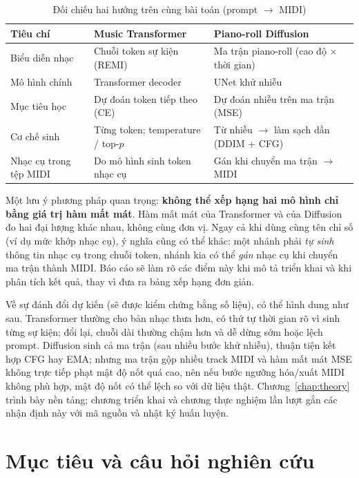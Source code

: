 \begin{table}[htbp]
\centering
\caption{Đối chiếu hai hướng trên cùng bài toán (prompt $\rightarrow$ MIDI)}
\label{tab:ch1-arch-preview}
\begin{tabular}{p{3.2cm}p{5.5cm}p{5.5cm}}
\toprule
\textbf{Tiêu chí} & \textbf{Music Transformer} & \textbf{Piano-roll Diffusion} \\
\midrule
Biểu diễn nhạc &
Chuỗi token sự kiện (REMI) &
Ma trận piano-roll (cao độ $\times$ thời gian) \\
\midrule
Mô hình chính &
Transformer decoder &
UNet khử nhiễu \\
\midrule
Mục tiêu học &
Dự đoán token tiếp theo (CE) &
Dự đoán nhiễu trên ma trận (MSE) \\
\midrule
Cơ chế sinh &
Từng token; temperature / top-$p$ &
Từ nhiễu $\rightarrow$ làm sạch dần (DDIM + CFG) \\
\midrule
Nhạc cụ trong tệp MIDI &
Do mô hình sinh token nhạc cụ &
Gán khi chuyển ma trận $\rightarrow$ MIDI \\
\bottomrule
\end{tabular}
\end{table}

Một lưu ý phương pháp quan trọng: \textbf{không thể xếp hạng hai mô hình chỉ bằng giá trị hàm mất mát}. Hàm mất mát của Transformer và của Diffusion đo hai đại lượng khác nhau, không cùng đơn vị. Ngay cả khi dùng cùng tên chỉ số (ví dụ mức khớp nhạc cụ), ý nghĩa cũng có thể khác: một nhánh phải \textit{tự sinh} thông tin nhạc cụ trong chuỗi token, nhánh kia có thể \textit{gán} nhạc cụ khi chuyển ma trận thành MIDI. Báo cáo sẽ làm rõ các điểm này khi mô tả triển khai và khi phân tích kết quả, thay vì đưa ra bảng xếp hạng đơn giản.

Về sự đánh đổi dự kiến (sẽ được kiểm chứng bằng số liệu), có thể hình dung như sau. Transformer thường cho bản nhạc thưa hơn, có thứ tự thời gian rõ vì sinh từng sự kiện; đổi lại, chuỗi dài thường chậm hơn và dễ dừng sớm hoặc lệch prompt. Diffusion sinh cả ma trận (sau nhiều bước khử nhiễu), thuận tiện kết hợp CFG hay EMA; nhưng ma trận gộp nhiều track MIDI và hàm mất mát MSE không trực tiếp phạt mật độ nốt quá cao, nên nếu bước ngưỡng hóa/xuất MIDI không phù hợp, mật độ nốt có thể lệch so với dữ liệu thật. Chương~\ref{chap:theory} trình bày nền tảng; chương triển khai và chương thực nghiệm lần lượt gắn các nhận định này với mã nguồn và nhật ký huấn luyện.

\section{Mục tiêu và câu hỏi nghiên cứu}
\label{sec:ch1-objectives}

